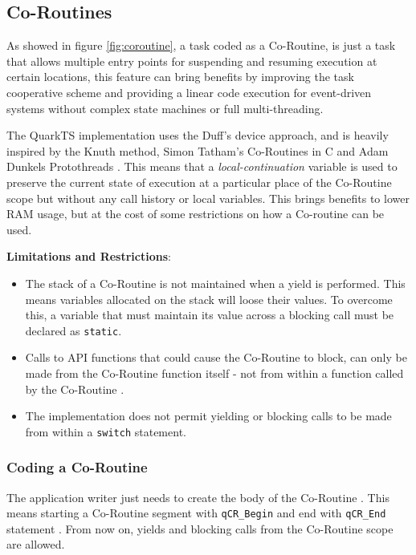 \subsection{Co-Routines}
As showed in figure \ref{fig:coroutine}, a task coded as a Co-Routine, is just a task that allows multiple entry points for suspending and resuming execution at certain locations, this feature can bring benefits by improving the task cooperative scheme and providing a linear code execution for event-driven systems without complex state machines or full multi-threading.
\medskip


    
The QuarkTS implementation uses the Duff's device approach, and is heavily inspired by the Knuth method\cite{knuth}, Simon Tatham's Co-Routines in C \cite{tatham} and Adam Dunkels Protothreads \cite{dunkels}. This means that a \textit{local-continuation} variable is used to preserve the current state of execution at a particular place of the Co-Routine scope but without any call history or local variables. This brings benefits to lower RAM usage, but at the cost of some restrictions on how a Co-routine can be used.
\medskip

\textbf{Limitations and Restrictions}:

\begin{itemize}
    \item The stack of a Co-Routine  is not maintained when a yield is performed. This means variables allocated on the stack will loose their values. To overcome this, a variable that must maintain its value across a blocking call must be declared as \lstinline{static}.
    \item Calls to API functions that could cause the Co-Routine to block, can only be made from the Co-Routine  function itself - not from within a function called by the Co-Routine .
    \item The implementation does not permit yielding or blocking calls to be made from within a \lstinline{switch} statement.
\end{itemize}

\subsubsection{Coding a Co-Routine}
The application writer just needs to create the body of the Co-Routine . This means starting a Co-Routine segment with \lstinline{qCR_Begin}  and end with \lstinline{qCR_End} statement . From now on, yields and blocking calls from the Co-Routine scope are allowed.
\medskip

